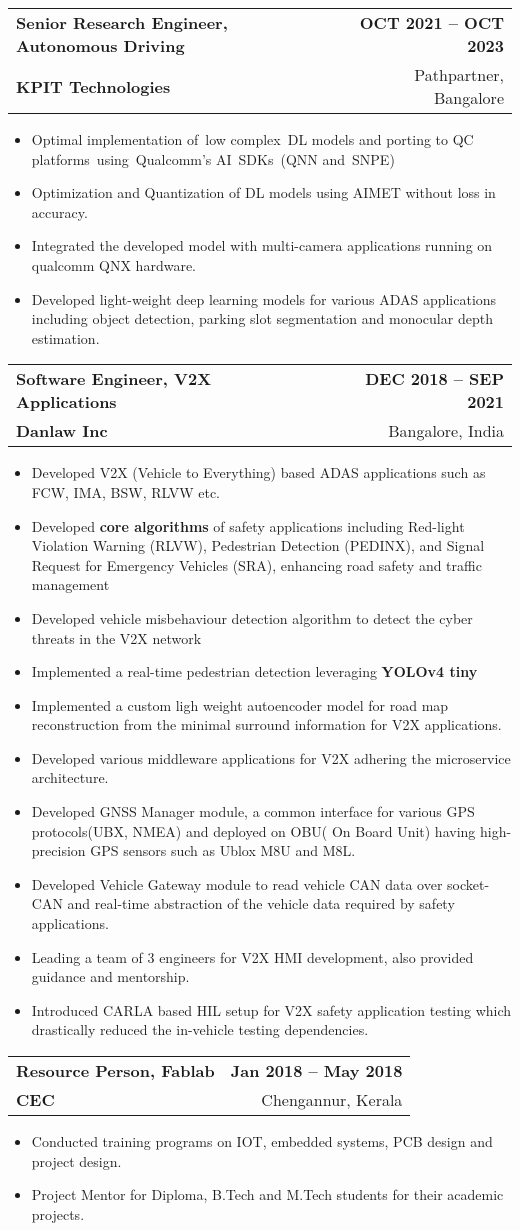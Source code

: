 \documentclass[letterpaper,11pt]{article}
\makeatletter
\newcommand{\resumeItem}[1]{
  \item\small{
    {#1 \vspace{-2pt}}
  }
}
\newcommand{\resumeSubheading}[4]{
  \vspace{-2pt}\item
    \begin{tabular*}{1.0\textwidth}[t]{l@{\extracolsep{\fill}}r}
      \textbf{#1} & \textbf{\small #2} \\
      {\small#3} & {\small #4}
    \end{tabular*}\vspace{-7pt}
}
\newcommand{\resumeItemListStart}{\begin{itemize}}
\newcommand{\resumeItemListEnd}{\end{itemize}\vspace{-5pt}}
\makeatother
\begin{document}
    \resumeSubheading
      {Senior Research Engineer, Autonomous Driving}{OCT 2021 -- OCT 2023}
      {\textbf{KPIT Technologies}}{Pathpartner, Bangalore}      
    \resumeItemListStart
        \resumeItem{Optimal implementation of low complex DL models and porting to QC platforms using Qualcomm's AI SDKs (QNN and SNPE)}
        \resumeItem{Optimization and  Quantization of DL models using AIMET without loss in accuracy.}
        \resumeItem{Integrated the developed model with multi-camera applications running on qualcomm QNX hardware.}
        \resumeItem{Developed light-weight deep learning models for various ADAS applications including object detection, parking slot segmentation and monocular depth estimation.}
    \resumeItemListEnd    
    \resumeSubheading
      {Software Engineer, V2X Applications}{DEC 2018 -- SEP 2021}
      {\textbf{Danlaw Inc}}{Bangalore, India}      
      \resumeItemListStart
      \resumeItem{ Developed V2X (Vehicle to Everything) based ADAS applications such as FCW, IMA, BSW, RLVW etc.} 
        
        \resumeItem{Developed \textbf{core algorithms} of safety applications including Red-light Violation Warning (RLVW), Pedestrian Detection (PEDINX), and Signal Request for Emergency Vehicles (SRA), enhancing road safety and traffic management}     
        \resumeItem{Developed vehicle misbehaviour detection algorithm to detect the cyber threats in the V2X network}
        \resumeItem{Implemented a real-time pedestrian detection leveraging \textbf{YOLOv4 tiny}}
        \resumeItem{Implemented a custom ligh weight autoencoder model  for road map reconstruction from the minimal surround information  for V2X applications.}
        \resumeItem{Developed various middleware applications for V2X adhering the microservice architecture.}
        \resumeItem{Developed GNSS Manager module, a common interface for various GPS protocols(UBX, NMEA) and deployed on OBU( On Board Unit) having high-precision GPS sensors such as Ublox M8U and M8L.}
        \resumeItem{Developed Vehicle Gateway module to read vehicle CAN data over socket-CAN and real-time abstraction of the vehicle data required by safety applications.}
        \resumeItem{Leading a team of 3 engineers for V2X HMI development, also provided guidance and mentorship.}   
        \resumeItem{Introduced CARLA based HIL setup for V2X safety application testing which drastically reduced the in-vehicle testing dependencies.}       
      \resumeItemListEnd
      \resumeSubheading
      {Resource Person, Fablab}{Jan 2018 -- May 2018}
      {\textbf{CEC}}{Chengannur, Kerala}      
    \resumeItemListStart
        \resumeItem{Conducted training programs on IOT, embedded systems, PCB design and project design.}
        \resumeItem {Project Mentor for Diploma, B.Tech and M.Tech students for their academic projects.}
    \resumeItemListEnd
\end{document}
